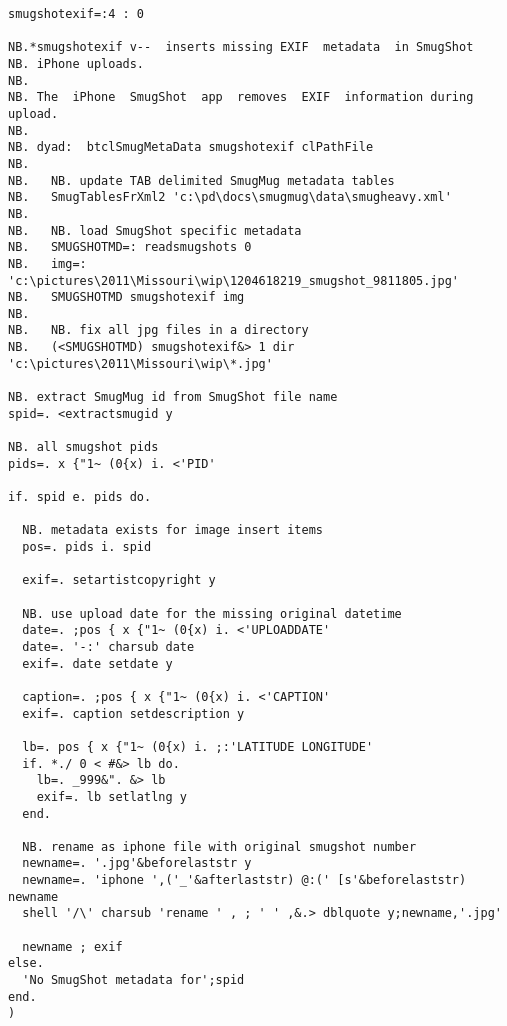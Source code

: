 \begin{lstlisting}[language=jdoc, frame=single,framerule=0pt,label=lst:scr1258X0]
smugshotexif=:4 : 0

NB.*smugshotexif v--  inserts missing EXIF  metadata  in SmugShot
NB. iPhone uploads.
NB.
NB. The  iPhone  SmugShot  app  removes  EXIF  information during upload.
NB.
NB. dyad:  btclSmugMetaData smugshotexif clPathFile
NB.
NB.   NB. update TAB delimited SmugMug metadata tables
NB.   SmugTablesFrXml2 'c:\pd\docs\smugmug\data\smugheavy.xml'
NB.
NB.   NB. load SmugShot specific metadata
NB.   SMUGSHOTMD=: readsmugshots 0
NB.   img=: 'c:\pictures\2011\Missouri\wip\1204618219_smugshot_9811805.jpg'
NB.   SMUGSHOTMD smugshotexif img
NB.
NB.   NB. fix all jpg files in a directory
NB.   (<SMUGSHOTMD) smugshotexif&> 1 dir 'c:\pictures\2011\Missouri\wip\*.jpg'

NB. extract SmugMug id from SmugShot file name
spid=. <extractsmugid y

NB. all smugshot pids
pids=. x {"1~ (0{x) i. <'PID'

if. spid e. pids do.

  NB. metadata exists for image insert items
  pos=. pids i. spid

  exif=. setartistcopyright y

  NB. use upload date for the missing original datetime
  date=. ;pos { x {"1~ (0{x) i. <'UPLOADDATE'
  date=. '-:' charsub date
  exif=. date setdate y

  caption=. ;pos { x {"1~ (0{x) i. <'CAPTION'
  exif=. caption setdescription y

  lb=. pos { x {"1~ (0{x) i. ;:'LATITUDE LONGITUDE'
  if. *./ 0 < #&> lb do.
    lb=. _999&". &> lb
    exif=. lb setlatlng y
  end.

  NB. rename as iphone file with original smugshot number
  newname=. '.jpg'&beforelaststr y
  newname=. 'iphone ',('_'&afterlaststr) @:(' [s'&beforelaststr) newname
  shell '/\' charsub 'rename ' , ; ' ' ,&.> dblquote y;newname,'.jpg'

  newname ; exif
else.
  'No SmugShot metadata for';spid
end.
)
\end{lstlisting}


%